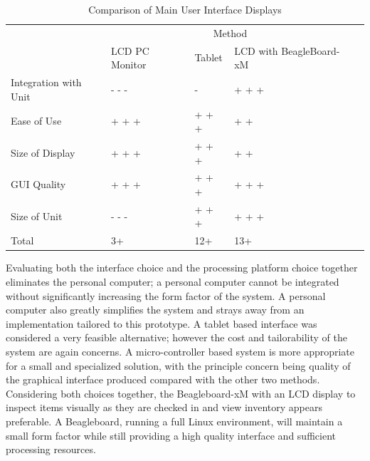 \documentclass[11pt]{article} %
\begin{document}
\begin{table}[h!]
\vspace{0.5cm}
\caption{Comparison of Main User Interface Displays}
\begin{tabular}{| p{1.6in} | p{1in} | p{1.4in} | p{1.5in} | p{1.5in} |}
\cline{2-4}
\multicolumn{1}{c}{}&\multicolumn{3}{|c|}{Method} \\
\cline{2-4}
\multicolumn{1}{c|}{}&LCD PC \newline Monitor&Tablet&LCD with \newline BeagleBoard-xM\\
\hline
Integration with Unit&- - -&-&+ + +\\
\hline
Ease of Use&+ + +&+ + +&+ +\\
\hline
Size of Display& + + + &+ + +&+ +\\
\hline
GUI Quality&+ + +&+ + +&+ + +\\
\hline
Size of Unit&- - -&+ + +&+ + +\\
\hline
\hline
Total&3+&12+&13+\\
\hline
\end{tabular}
\label{tab:disp}
\end{table}
\noindent Evaluating both the interface choice and the processing platform choice together eliminates the personal computer; a personal computer cannot be integrated without significantly increasing the form factor of the system. A personal computer also greatly simplifies the system and strays away from an implementation tailored to this prototype. A tablet based interface was considered a very feasible alternative; however the cost and tailorability of the system are again concerns. A micro-controller based system is more appropriate for a small and specialized solution, with the principle concern being quality of the graphical interface produced compared with the other two methods. Considering both choices together, the Beagleboard-xM with an LCD display to inspect items visually as they are checked in and view inventory appears preferable. A Beagleboard, running a full Linux environment, will maintain a small form factor while still providing a high quality interface and sufficient processing resources.
\end{document}

